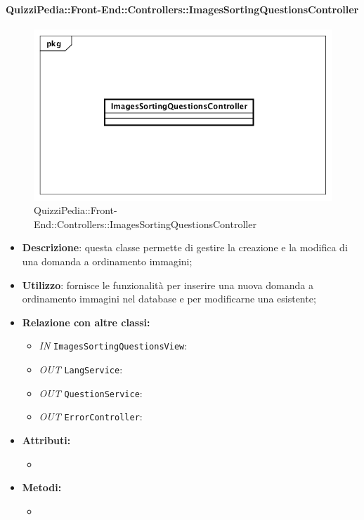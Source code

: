 \paragraph{QuizziPedia::Front-End::Controllers::ImagesSortingQuestionsController}
\begin{figure}
	\centering
	\includegraphics[scale=0.45]{UML/Classi/Front-End/QuizziPedia_Front-end_Controller_ImagesSortingQuestionsController.png}
	\caption{QuizziPedia::Front-End::Controllers::ImagesSortingQuestionsController}
\end{figure}
\begin{itemize}
	\item \textbf{Descrizione}: questa classe permette di gestire la creazione e la modifica di una domanda a ordinamento immagini;
	\item \textbf{Utilizzo}: fornisce le funzionalità per inserire una nuova domanda a ordinamento immagini nel database e per modificarne una esistente;
	\item \textbf{Relazione con altre classi:}
	\begin{itemize}
		\item \textit{IN} \texttt{ImagesSortingQuestionsView}:  
		\item \textit{OUT} \texttt{LangService}: 
		\item \textit{OUT} \texttt{QuestionService}:
		\item \textit{OUT} \texttt{ErrorController}: 
	\end{itemize}
	\item \textbf{Attributi:}
	\begin{itemize}
		\item 
	\end{itemize}
	\item \textbf{Metodi:}
	\begin{itemize}
		\item 
	\end{itemize}
\end{itemize}


